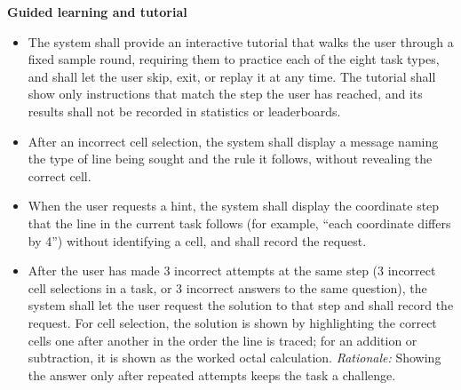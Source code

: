 \documentclass[12pt]{article}
\newcounter{reqnum} %
\begin{document}
\noindent \textbf{Guided learning and tutorial}
\begin{itemize}
 
\item[FR\refstepcounter{reqnum}\thereqnum \label{FR_Tutorial}:] The system shall provide an interactive tutorial that walks the user through a fixed sample round, requiring them to practice each of the eight task types, and shall let the user skip, exit, or replay it at any time. The tutorial shall show only instructions that match the step the user has reached, and its results shall not be recorded in statistics or leaderboards.
 
\item[FR\refstepcounter{reqnum}\thereqnum \label{FR_ExplainCell}:] After an incorrect cell selection, the system shall display a message naming the type of line being sought and the rule it follows, without revealing the correct cell.
 
\item[FR\refstepcounter{reqnum}\thereqnum \label{FR_Hint}:] When the user requests a hint, the system shall display the coordinate step that the line in the current task follows (for example, ``each coordinate differs by 4'') without identifying a cell, and shall record the request.
 
\item[FR\refstepcounter{reqnum}\thereqnum \label{FR_SolutionPath}:] After the user has made 3 incorrect attempts at the same step (3 incorrect cell selections in a task, or 3 incorrect answers to the same question), the system shall let the user request the solution to that step and shall record the request. For cell selection, the solution is shown by highlighting the correct cells one after another in the order the line is traced; for an addition or subtraction, it is shown as the worked octal calculation. \newline \textit{Rationale:} Showing the answer only after repeated attempts keeps the task a challenge.
 
\end{itemize}
 
\end{document}
